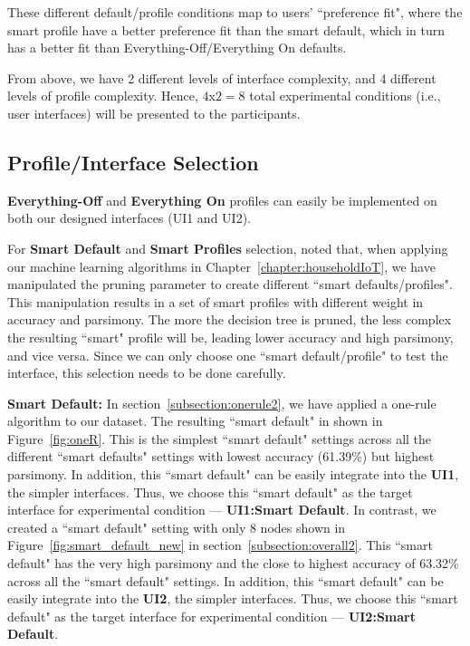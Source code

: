 These different default/profile conditions map to users' ``preference fit", where the smart profile have a better preference fit than the smart default, which in turn has a better fit than Everything-Off/Everything On defaults.

From above, we have 2 different levels of interface complexity, and 4 different levels of profile complexity.
Hence, $4$x$2=8$ total experimental conditions (i.e., user interfaces) will be presented to the participants. 

\subsection{Profile/Interface Selection}
\textbf{Everything-Off} and \textbf{Everything On} profiles can easily be implemented on both our designed interfaces (UI1 and UI2).

For \textbf{Smart Default} and \textbf{Smart Profiles} selection, noted that, when applying our machine learning algorithms in Chapter~\ref{chapter:householdIoT}, we have manipulated the pruning parameter to create different ``smart defaults/profiles". This manipulation results in a set of smart profiles with different weight in accuracy and parsimony. The more the decision tree is pruned, the less complex the resulting ``smart" profile will be, leading lower accuracy and high parsimony, and vice versa. Since we can only choose one ``smart default/profile" to test the interface, this selection needs to be done carefully.

\textbf{Smart Default:} In section~\ref{subsection:onerule2}, we have applied a one-rule algorithm to our dataset. The resulting ``smart default" in shown in Figure~\ref{fig:oneR}. This is the simplest ``smart default" settings across all the different ``smart defaults" settings with lowest accuracy (61.39\%) but highest parsimony. In addition, this ``smart default" can be easily integrate into the \textbf{UI1}, the simpler interfaces. Thus, we choose this ``smart default" as the target interface for experimental condition --- \textbf{UI1:Smart Default}. In contrast, we created a ``smart default" setting with only 8 nodes shown in Figure~\ref{fig:smart_default_new} in section~\ref{subsection:overall2}. This ``smart default" has the very high parsimony and the close to highest accuracy of 63.32\% across all the ``smart default" settings. In addition, this ``smart default" can be easily integrate into the \textbf{UI2}, the simpler interfaces. Thus, we choose this ``smart default" as the target interface for experimental condition --- \textbf{UI2:Smart Default}.

